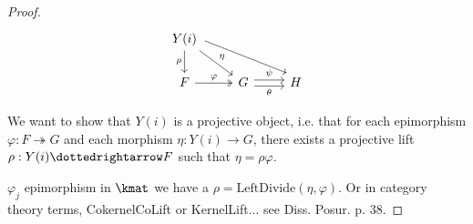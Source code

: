 

\begin{proof}
\[
\begin{tikzcd}
Y(i) \arrow[d, "\rho"'] \arrow[rd, "\eta"] \arrow[rrd, shift left=2] &                                                                   &   \\
F \arrow[r, "\varphi", two heads]                                  & G \arrow[r, "\theta"', shift right] \arrow[r, "\psi", shift left] & H
\end{tikzcd}
\]

We want to show that $Y(i)$ is a projective object, i.e. that for each epimorphism $\varphi : F \twoheadrightarrow G$ and each
morphism $\eta : Y(i) \rightarrow G$, there exists a projective lift $\rho : Y(i) \dottedrightarrow F$ such that $\eta = \rho\varphi$.

$\varphi_{j}$ epimorphism in $\kmat$ we have a $\rho = \mathrm{LeftDivide}( \eta, \varphi )$. Or in category theory terms,
CokernelCoLift or KernelLift... see Diss. Posur. p. 38.


\end{proof}
